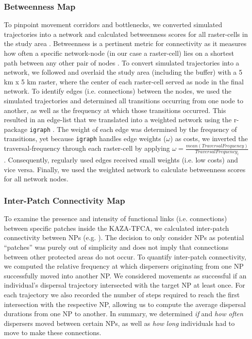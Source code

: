 \documentclass[abstract=on,10pt,a4paper,bibliography=totocnumbered]{article}
\begin{document}
\subsubsection{Betweenness Map}
To pinpoint movement corridors and bottlenecks, we converted simulated
trajectories into a network and calculated betweenness scores for all
raster-cells in the study area \citep{BastilleRousseau.2018}. Betweenness is a
pertinent metric for connectivity as it measures how often a specific
network-node (in our case a raster-cell) lies on a shortest path between any
other pair of nodes \citep{BastilleRousseau.2018}. To convert simulated
trajectories into a network, we followed \cite{BastilleRousseau.2018} and
overlaid the study area (including the buffer) with a 5 km x 5 km raster, where
the center of each raster-cell served as node in the final network. To identify
edges (i.e. connections) between the nodes, we used the simulated trajectories
and determined all transitions occurring from one node to another, as well as
the frequency at which those transitions occurred. This resulted in an edge-list
that we translated into a weighted network using the r-package {\tt igraph}
\citep{Gabor.2006}. The weight of each edge was determined by the frequency of
transitions, yet because {\tt igraph} handles edge weights (\(\omega\)) as
costs, we inverted the traversal-frequency through each raster-cell by applying
\(\omega = \frac{mean(Traversal Frequency)}{Traversal Frequency_i}\).
Consequently, regularly used edges received small weights (i.e. low costs) and
vice versa. Finally, we used the weighted network to calculate betweenness
scores for all network nodes.

\subsubsection{Inter-Patch Connectivity Map}
To examine the presence and intensity of functional links (i.e. connections)
between specific patches inside the KAZA-TFCA, we calculated inter-patch
connectivity between NPs (e.g. \citep{Gustafson.1996, Kanagaraj.2013}). The
decision to only consider NPs as potential ``patches'' was purely out of
simplicity and does not imply that connections between other protected areas do
not occur. To quantify inter-patch connectivity, we computed the relative
frequency at which dispersers originating from one NP successfully moved into
another NP. We considered movements as successful if an individual's dispersal
trajectory intersected with the target NP at least once. For each trajectory we
also recorded the number of steps required to reach the first intersection with
the respective NP, allowing us to compute the average dispersal durations from
one NP to another. In summary, we determined \textit{if} and \textit{how often}
dispersers moved between certain NPs, as well as \textit{how long} individuals
had to move to make these connections.
\end{document}

